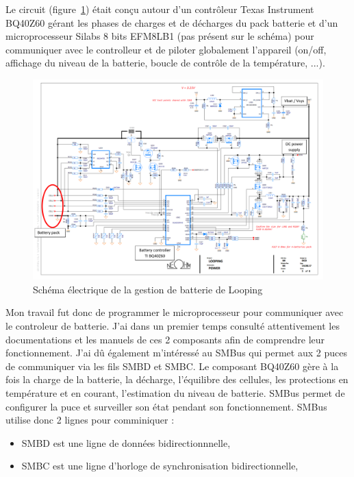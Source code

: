 \documentclass[a4paper, 11pt]{report}
\begin{document}
Le circuit (figure~\ref{fig:looping_charger}) était conçu autour d'un contrôleur Texas Instrument BQ40Z60 gérant les phases de charges et de décharges du pack batterie et d'un microprocesseur Silabs 8 bits EFM8LB1 (pas présent sur le schéma) pour communiquer avec le controlleur et de piloter globalement l'appareil (on/off, affichage du niveau de la batterie, boucle de contrôle de la température, ...).

\begin{figure}[!h]
\begin{center}
\includegraphics[scale=0.6]{figures/screenshots/battery_charger.png}
\end{center}
\caption{Schéma électrique de la gestion de batterie de Looping}
\label{fig:looping_charger}
\end{figure}

Mon travail fut donc de programmer le microprocesseur pour communiquer avec le controleur de batterie. J’ai dans un premier temps consulté attentivement les documentations et les manuels de ces 2 composants afin de comprendre leur fonctionnement. J’ai dû également m’intéressé au SMBus 
qui permet aux 2 puces de communiquer via les fils SMBD et SMBC.
Le composant BQ40Z60 gère à la fois la charge de la batterie, la décharge, l’équilibre des cellules, les protections en température et en courant, l’estimation du niveau de batterie. SMBus permet de configurer la puce et surveiller son état pendant son fonctionnement.
SMBus utilise donc 2 lignes pour comminiquer :
\begin{itemize} %
\item SMBD est une ligne de données bidirectionnnelle,
\item SMBC est une ligne d'horloge de synchronisation bidirectionnelle,
\end{itemize}
\end{document}
